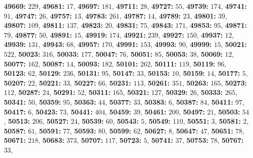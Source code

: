 \textsf{\bfseries 49669:} $229$, \textsf{\bfseries 49681:} $17$, \textsf{\bfseries 49697:} $181$, \textsf{\bfseries 49711:} $28$, \textsf{\bfseries 49727:} $55$, \textsf{\bfseries 49739:} $174$, \textsf{\bfseries 49741:} $91$, \textsf{\bfseries 49747:} $26$, \textsf{\bfseries 49757:} $13$, \textsf{\bfseries 49783:} $261$, \textsf{\bfseries 49787:} $14$, \textsf{\bfseries 49789:} $23$, \textsf{\bfseries 49801:} $39$, \textsf{\bfseries 49807:} $109$, \textsf{\bfseries 49811:} $137$, \textsf{\bfseries 49823:} $20$, \textsf{\bfseries 49831:} $75$, \textsf{\bfseries 49843:} $171$, \textsf{\bfseries 49853:} $95$, \textsf{\bfseries 49871:} $79$, \textsf{\bfseries 49877:} $50$, \textsf{\bfseries 49891:} $15$, \textsf{\bfseries 49919:} $174$, \textsf{\bfseries 49921:} $239$, \textsf{\bfseries 49927:} $150$, \textsf{\bfseries 49937:} $12$, \textsf{\bfseries 49939:} $131$, \textsf{\bfseries 49943:} $68$, \textsf{\bfseries 49957:} $170$, \textsf{\bfseries 49991:} $153$, \textsf{\bfseries 49993:} $90$, \textsf{\bfseries 49999:} $15$, \textsf{\bfseries 50021:} $522$, \textsf{\bfseries 50023:} $316$, \textsf{\bfseries 50033:} $177$, \textsf{\bfseries 50047:} $76$, \textsf{\bfseries 50051:} $85$, \textsf{\bfseries 50053:} $38$, \textsf{\bfseries 50069:} $12$, \textsf{\bfseries 50077:} $162$, \textsf{\bfseries 50087:} $14$, \textsf{\bfseries 50093:} $182$, \textsf{\bfseries 50101:} $262$, \textsf{\bfseries 50111:} $119$, \textsf{\bfseries 50119:} $96$, \textsf{\bfseries 50123:} $62$, \textsf{\bfseries 50129:} $236$, \textsf{\bfseries 50131:} $95$, \textsf{\bfseries 50147:} $33$, \textsf{\bfseries 50153:} $10$, \textsf{\bfseries 50159:} $14$, \textsf{\bfseries 50177:} $5$, \textsf{\bfseries 50207:} $22$, \textsf{\bfseries 50221:} $33$, \textsf{\bfseries 50227:} $66$, \textsf{\bfseries 50231:} $113$, \textsf{\bfseries 50261:} $351$, \textsf{\bfseries 50263:} $165$, \textsf{\bfseries 50273:} $112$, \textsf{\bfseries 50287:} $24$, \textsf{\bfseries 50291:} $52$, \textsf{\bfseries 50311:} $165$, \textsf{\bfseries 50321:} $127$, \textsf{\bfseries 50329:} $26$, \textsf{\bfseries 50333:} $265$, \textsf{\bfseries 50341:} $50$, \textsf{\bfseries 50359:} $95$, \textsf{\bfseries 50363:} $44$, \textsf{\bfseries 50377:} $33$, \textsf{\bfseries 50383:} $6$, \textsf{\bfseries 50387:} $84$, \textsf{\bfseries 50411:} $97$, \textsf{\bfseries 50417:} $6$, \textsf{\bfseries 50423:} $73$, \textsf{\bfseries 50441:} $404$, \textsf{\bfseries 50459:} $39$, \textsf{\bfseries 50461:} $200$, \textsf{\bfseries 50497:} $21$, \textsf{\bfseries 50503:} $54$, \textsf{\bfseries 50513:} $206$, \textsf{\bfseries 50527:} $24$, \textsf{\bfseries 50539:} $60$, \textsf{\bfseries 50543:} $5$, \textsf{\bfseries 50549:} $110$, \textsf{\bfseries 50551:} $3$, \textsf{\bfseries 50581:} $2$, \textsf{\bfseries 50587:} $61$, \textsf{\bfseries 50591:} $77$, \textsf{\bfseries 50593:} $80$, \textsf{\bfseries 50599:} $62$, \textsf{\bfseries 50627:} $8$, \textsf{\bfseries 50647:} $47$, \textsf{\bfseries 50651:} $78$, \textsf{\bfseries 50671:} $218$, \textsf{\bfseries 50683:} $373$, \textsf{\bfseries 50707:} $117$, \textsf{\bfseries 50723:} $5$, \textsf{\bfseries 50741:} $37$, \textsf{\bfseries 50753:} $78$, \textsf{\bfseries 50767:} $33$, 
